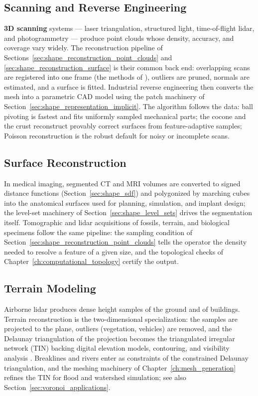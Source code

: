 \subsection{Scanning and Reverse Engineering}

\textbf{3D scanning} systems --- laser triangulation, structured light,
time-of-flight lidar, and photogrammetry --- produce point clouds whose
density, accuracy, and coverage vary widely. The reconstruction pipeline of
Sections~\ref{sec:shape_reconstruction_point_clouds} and
\ref{sec:shape_reconstruction_surface} is their common back end: overlapping
scans are registered into one frame (the methods of \cite{besl1992,chen1992}),
outliers are pruned, normals are estimated, and a surface is fitted. Industrial
reverse engineering then converts the mesh into a parametric CAD model using
the patch machinery of Section~\ref{sec:shape_representation_implicit}. The
algorithm follows the data: ball pivoting \cite{bernardini1999} is fastest and
fits uniformly sampled mechanical parts; the cocone \cite{amenta2000} and the
crust \cite{amentabern1999} reconstruct provably correct surfaces from
feature-adaptive samples; Poisson reconstruction \cite{kazhdan2006} is the
robust default for noisy or incomplete scans.

\subsection{Surface Reconstruction}

In medical imaging, segmented CT and MRI volumes are converted to signed
distance functions (Section~\ref{sec:shape_sdf}) and polygonized by marching
cubes \cite{lorensen1987} into the anatomical surfaces used for planning,
simulation, and implant design; the level-set machinery of
Section~\ref{sec:shape_level_sets} drives the segmentation itself. Tomographic
and lidar acquisitions of fossils, terrain, and biological specimens follow the
same pipeline: the sampling condition of
Section~\ref{sec:shape_reconstruction_point_clouds} tells the operator the
density needed to resolve a feature of a given size, and the topological
checks of Chapter~\ref{ch:computational_topology} certify the output.

\subsection{Terrain Modeling}

Airborne lidar produces dense height samples of the ground and of buildings.
Terrain reconstruction is the two-dimensional specialization: the samples are
projected to the plane, outliers (vegetation, vehicles) are removed, and the
Delaunay triangulation of the projection becomes the triangulated irregular
network (TIN) backing digital elevation models, contouring, and visibility
analysis \cite{deberg2008}. Breaklines and rivers enter as constraints of the
constrained Delaunay triangulation, and the meshing machinery of
Chapter~\ref{ch:mesh_generation} refines the TIN for flood and watershed
simulation; see also Section~\ref{sec:voronoi_applications}.

